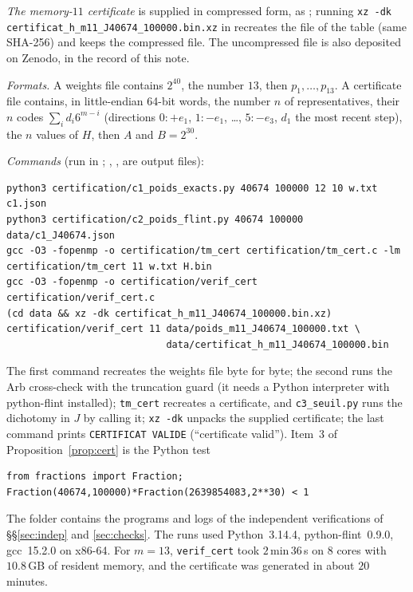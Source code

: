 \documentclass[11pt,a4paper]{article}
\theoremstyle{plain}
\theoremstyle{remark}
\numberwithin{equation}{section}
\begin{document}
\medskip
\noindent\emph{The memory-$11$ certificate} is supplied in compressed form, as ;
running \texttt{xz -dk certificat\_h\_m11\_J40674\_100000.bin.xz} in  recreates the file 
of the table (same SHA-256) and keeps the compressed file. The uncompressed file is also deposited on Zenodo, in the record of this note.

\noindent\emph{Formats.} A weights file contains $2^{40}$, the number $13$, then $p_1,\dots,p_{13}$. A certificate file contains, in
little-endian 64-bit words, the number $n$ of representatives, their $n$ codes $\sum_id_i6^{m-i}$ (directions $0{:}+e_1$, $1{:}-e_1$,
\dots, $5{:}-e_3$, $d_1$ the most recent step), the $n$ values of $H$, then $A$ and $B=2^{30}$.

\noindent\emph{Commands} (run in ; , ,  are output files):
{\footnotesize
\begin{verbatim}
python3 certification/c1_poids_exacts.py 40674 100000 12 10 w.txt c1.json
python3 certification/c2_poids_flint.py 40674 100000 data/c1_J40674.json
gcc -O3 -fopenmp -o certification/tm_cert certification/tm_cert.c -lm
certification/tm_cert 11 w.txt H.bin
gcc -O3 -fopenmp -o certification/verif_cert certification/verif_cert.c
(cd data && xz -dk certificat_h_m11_J40674_100000.bin.xz)
certification/verif_cert 11 data/poids_m11_J40674_100000.txt \
                            data/certificat_h_m11_J40674_100000.bin
\end{verbatim}}
\noindent The first command recreates the weights file byte for byte; the second runs the Arb cross-check with the truncation guard
(it needs a Python interpreter with python-flint installed); \texttt{tm\_cert} recreates a certificate, and \texttt{c3\_seuil.py} runs the dichotomy in $J$ by calling it;
\texttt{xz -dk} unpacks the supplied certificate; the last command prints \texttt{CERTIFICAT VALIDE} (``certificate valid''). Item~3 of Proposition~\ref{prop:cert} is the
Python test
{\footnotesize
\begin{verbatim}
from fractions import Fraction; Fraction(40674,100000)*Fraction(2639854083,2**30) < 1
\end{verbatim}}

\noindent The folder  contains the programs and logs of the independent verifications of \S\S\ref{sec:indep} and
\ref{sec:checks}. The runs used Python~3.14.4, python-flint~0.9.0, gcc~15.2.0 on x86-64. For $m=13$, \texttt{verif\_cert} took
$2$\,min\,$36$\,s on $8$ cores with $10.8$\,GB of resident memory, and the certificate was generated in about $20$ minutes.
\end{document}
